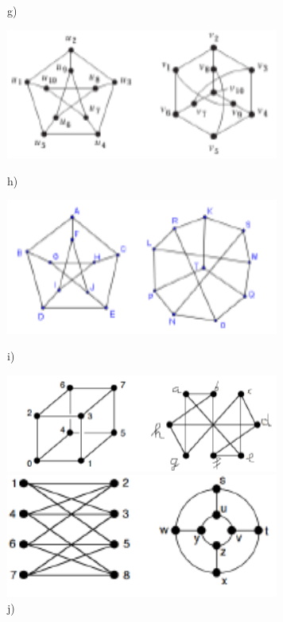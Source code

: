 \documentclass[a4paper]{article}
\begin{document}
\begin{figure}[ht]
\begin{minipage}{0.5\textwidth}
			\caption*{g)}
		\end{minipage}
		\begin{minipage}{0.5\textwidth}
			\centering
			\includegraphics[width=0.8\textwidth]{gprob4_8.png}
			\caption*{h)}
		\end{minipage}
		\begin{minipage}{0.5\textwidth}
			\centering
			\includegraphics[width=0.8\textwidth]{gprob4_9.png}
			\caption*{i)}
		\end{minipage}
		\begin{minipage}{0.5\textwidth}
			\centering
			\includegraphics[width=0.8\textwidth]{gprob4_10.png}
			\caption*{j)}
		\end{minipage}
		\begin{minipage}{0.5\textwidth}
			\centering
			\includegraphics[width=0.8\textwidth]{gprob4_11.png}

\end{minipage}
\end{figure}
\end{document}
